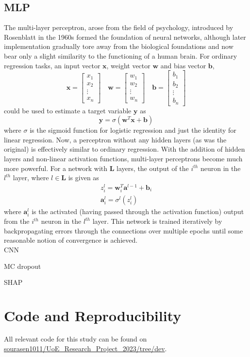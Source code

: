 \documentclass[%
 reprint,
 amsmath,amssymb,
 aps,nofootinbib
]{revtex4-2}
\begin{document}
\subsection{\label{non_param}MLP}
The multi-layer perceptron, arose from the field of psychology, introduced by Rosenblatt in the 1960s \cite{mlp} formed the foundation of neural networks, although later implementation gradually tore away from the biological foundations and now bear only a slight similarity to the functioning of a human brain. For ordinary regression tasks, an input vector $\mathbf{x}$, weight vector $\mathbf{w}$ and bias vector $\mathbf{b}$,
\[
\mathbf{x} = \begin{bmatrix}
x_1 \\
x_2 \\
\vdots \\
x_n
\end{bmatrix}
\quad
\mathbf{w} = \begin{bmatrix}
w_1 \\
w_2 \\
\vdots \\
w_n
\end{bmatrix}
\quad
\mathbf{b} = \begin{bmatrix}
b_1 \\
b_2 \\
\vdots \\
b_n
\end{bmatrix}
\]
could be used to estimate a target variable $\mathbf{y}$ as 
\[
\mathbf{y} = \sigma(\mathbf{w}^T\mathbf{x}+\mathbf{b})
\]
where $\sigma$ is the sigmoid function for logistic regression and just the identity for linear regression. Now, a perceptron without any hidden layers (as was the original) is effectively similar to ordinary regression. With the addition of hidden layers and non-linear activation functions, multi-layer perceptrons become much more powerful. For a network with $\mathbf{L}$ layers, the output of the $i^{th}$ neuron in the $l^{th}$ layer, where $l \in \mathbf{L}$ is given as
\begin{gather}
z^{l}_{i} = \mathbf{w}^{T}_{i}\mathbf{a}^{l-1} + \mathbf{b}_i\\
\mathbf{a}^{l}_i = \sigma^{l}(z^{l}_{i})
\end{gather}
where $\mathbf{a}^{l}_{i}$ is the activated (having passed through the activation function) output from the $i^{th}$ neuron in the $l^{th}$ layer. This network is trained iteratively by backpropagating \cite{backprop} errors through the connections over multiple epochs until some reasonable notion of convergence is achieved.\\

CNN

MC dropout

SHAP

\section{\label{perf}Code and Reproducibility }
All relevant code for this study can be found on \href{https://github.com/sourasen1011/UoE_Research_Project_2023/tree/dev}{sourasen1011/UoE\_Research\_Project\_2023/tree/dev}.
\end{document}
